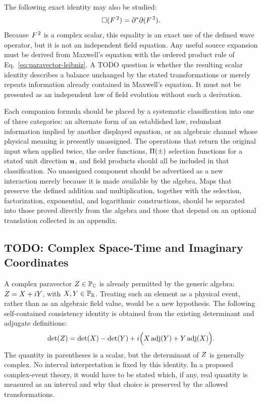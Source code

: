 The following exact identity may also be studied:
\begin{equation*}
\Box(F^{\,2})
=\partial^{*}\partial(F^{\,2}).
\end{equation*}
Because \(F^{\,2}\) is a complex scalar, this equality is an exact use
of the defined wave operator, but it is not an independent field equation.
Any useful source expansion must be derived from Maxwell's equation with the
ordered product rule of Eq.\ \eqref{eq:paravector-leibniz}. A TODO question
is whether the resulting scalar identity describes a balance unchanged by
the stated transformations or merely repeats information already contained
in Maxwell's equation. It must not be presented as an independent law of
field evolution without such a derivation.

Each companion formula should be placed by a systematic classification into
one of three categories: an alternate form of an established law, redundant
information implied by another displayed equation, or an algebraic channel
whose physical meaning is presently unassigned. The operations that return
the original input when applied twice, the order functions,
\(\Pi(\pm)\) selection functions for a stated unit direction
\(\mathbf{u}\), and field products should all be
included in that classification. No unassigned
component should be advertised as a new
interaction merely because it is made available by the algebra.
Maps that preserve the defined addition and multiplication, together with
the selection, factorization, exponential, and logarithmic constructions,
should be separated into those proved directly from the algebra and those
that depend on an optional translation collected in an appendix.

\subsection{TODO: Complex Space-Time and Imaginary Coordinates}
A complex paravector \(Z\in\mathbb{P}_{\mathbb{C}}\) is already permitted by the
generic algebra: \(Z=X+iY\), with
\(X,Y\in\mathbb{P}_{\mathbb{R}}\). Treating such an element as a physical event, rather than as an
algebraic field value, would be a new hypothesis. The following self-contained
consistency identity is obtained from the existing determinant and adjugate
definitions:
\begin{equation*}
\operatorname{det}\!\left(Z\right)
=\operatorname{det}\!\left(X\right)-\operatorname{det}\!\left(Y\right)
+i\Bigl(
  X\operatorname{adj}\!\left(Y\right)
 +Y\operatorname{adj}\!\left(X\right)
\Bigr).
\end{equation*}
The quantity in parentheses is a scalar, but the determinant of
\(Z\) is generally complex. No interval interpretation is fixed by this
identity. In a proposed complex-event theory, it would have to be stated which,
if any, real quantity is measured as an interval and why that choice is
preserved by the allowed transformations.

